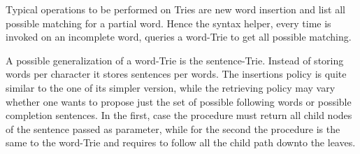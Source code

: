 Typical operations to be performed on Tries are new word insertion and list all possible matching for a partial word. Hence the syntax helper, every time is invoked on an incomplete word, queries a word-Trie to get all possible matching. 
\par A possible generalization of a word-Trie is the sentence-Trie. Instead of storing words per character it stores sentences per words. The insertions policy is quite similar to the one of its simpler version, while the retrieving policy may vary whether one wants to propose just the set of possible following words or possible completion sentences. In the first, case the procedure must return all child nodes of the sentence passed as parameter, while for the second the procedure is the same to the word-Trie and requires to follow all the child path downto the leaves.

